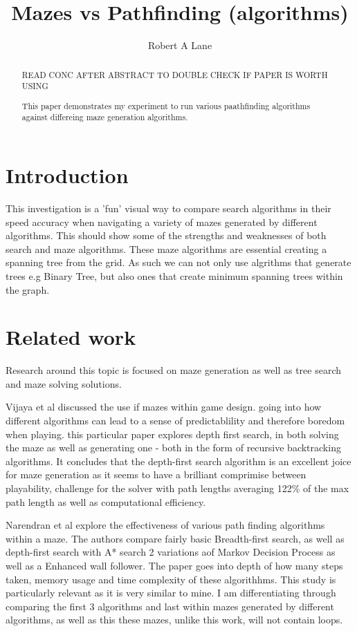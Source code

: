 \documentclass[conference]{IEEEtran}
\title{Mazes vs Pathfinding (algorithms)}
\author{Robert A Lane}
\begin{document}
 
\maketitle
\begin{abstract}
    \MakeUppercase{read conc after abstract to double check if paper is worth using}


    This paper demonstrates my experiment to run various paathfinding algorithms against
    differeing maze generation algorithms.    
\end{abstract}

\section{Introduction}
This investigation is a 'fun' visual way to compare search algorithms in their speed  accuracy when navigating a variety of mazes generated by different algorithms. This should show some of the strengths and weaknesses of both search and maze algorithms. These maze algorithms are essential creating a spanning tree from the grid. As such we can not only use algrithms that generate trees e.g Binary Tree, but also ones that create minimum spanning trees within the graph.
\section{Related work}

Research around this topic is focused on maze generation as well as tree search and maze solving solutions. 

\cite{vijayaAnalysisMazeGeneration2024} Vijaya et al discussed the use if mazes within game design. going into how different algorithms can lead to a sense of predictablility and therefore boredom when playing. this particular paper explores depth first search, in both solving the maze as well as generating one - both in the form of recursive backtracking algorithms. It concludes that the depth-first search algorithm is an excellent joice for maze generation as it seems to have a brilliant comprimise between playability, challenge for the solver with path lengths averaging 122\% of the max path length\cite{vijayaAnalysisMazeGeneration2024} as well as computational efficiency.

\cite{narendranMazeSolverExploringAlgorithmic2024} Narendran et al explore the effectiveness of various path finding algorithms within a maze. The authors compare fairly basic Breadth-first search, as well as depth-first search with A* search 2 variations aof Markov Decision Process as well as a Enhanced wall follower. The paper goes into depth of how many steps taken, memory usage and time complexity of these algorithhms. This study is particularly relevant as it is very similar to mine. I am differentiating through comparing the first 3 algorithms and last within mazes generated by different algorithms, as well as this these mazes, unlike this work, will not contain loops.
\end{document}
